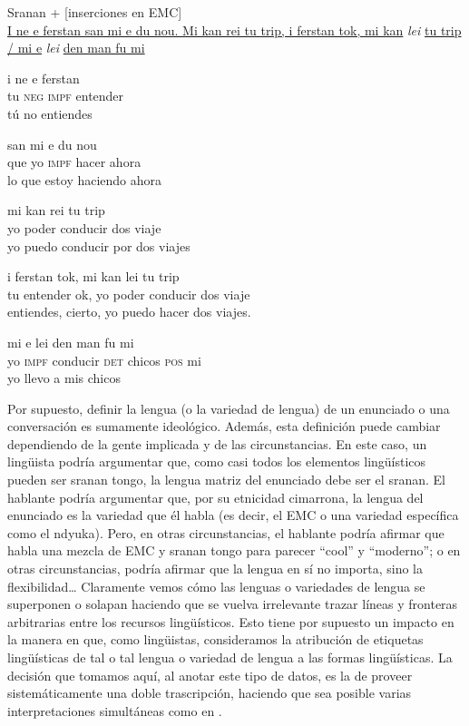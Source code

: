 \documentclass[output=paper]{langscibook}
\begin{document}
\ea\label{ex:leglise:5}
{ Sranan + [inserciones en EMC]}\\
\uline{I ne e ferstan san mi e du nou. Mi kan rei tu trip, i ferstan tok, mi kan} \textit{lei} \uline{tu trip / mi e} \textit{lei} \uline{den man fu mi}\\
\z

\ea\label{ex:leglise:6}
\ea
\gll i  ne  e  ferstan\\
     tu  \textsc{neg}  \textsc{impf}  entender\\
\glt tú no entiendes

\ex
\gll san  mi  e  du  nou  \\
     que  yo  \textsc{impf}  hacer  ahora\\
\glt lo que estoy haciendo ahora

\ex
\gll mi  kan    rei    tu  trip\\
     yo  poder     conducir  dos  viaje\\
\glt yo puedo conducir por dos viajes

\ex
\gll i  ferstan        tok,  mi  kan  lei           tu  trip\\
     tu   entender    ok,   yo  poder  conducir dos viaje\\
\glt entiendes, cierto, yo puedo hacer dos viajes.

\ex
\gll mi  e  lei    den  man  fu  mi\\
     yo  \textsc{impf}  conducir  \textsc{det}  chicos   \textsc{pos}  mi\\
\glt yo llevo a mis chicos
\z
\z

Por supuesto, definir la lengua (o la variedad de lengua) de un enunciado o una conversación es sumamente ideológico. Además, esta definición puede cambiar dependiendo de la gente implicada y de las circunstancias. En este caso, un lingüista podría argumentar que, como casi todos los elementos lingüísticos pueden ser sranan tongo, la lengua matriz del enunciado debe ser el sranan. El hablante podría argumentar que, por su etnicidad cimarrona, la lengua del enunciado es la variedad que él habla (es decir, el EMC o una variedad específica como el ndyuka). Pero, en otras circunstancias, el hablante podría afirmar que habla una mezcla de EMC y sranan tongo para parecer “cool” y “moderno”; o en otras circunstancias, podría afirmar que la lengua en sí no importa, sino la flexibilidad… Claramente vemos cómo las lenguas o variedades de lengua se superponen o solapan haciendo que se vuelva irrelevante trazar líneas y fronteras arbitrarias entre los recursos lingüísticos. Esto tiene por supuesto un impacto en la manera en que, como lingüistas, consideramos la atribución de etiquetas lingüísticas de tal o tal lengua o variedad de lengua a las formas lingüísticas. La decisión que tomamos aquí, al anotar este tipo de datos, es la de proveer sistemáticamente una doble trascripción, haciendo que sea posible varias interpretaciones simultáneas como en .
\end{document}
